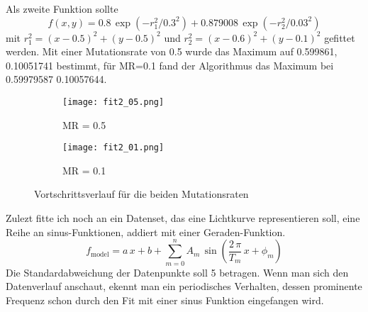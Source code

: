 \documentclass[12pt]{article}
\begin{document}
\newpage
Als zweite Funktion sollte 
$$f(x,y)=0.8\,\exp(-r_1^2/0.3^2)+0.879008\,\exp(-r_2^2/0.03^2)$$
mit $r_1^2=(x-0.5)^2+(y-0.5)^2$ und $r_2^2=(x-0.6)^2+(y-0.1)^2$ gefittet werden.\newline\newline
Mit einer Mutationsrate von 0.5 wurde das Maximum auf 0.599861, 0.10051741 bestimmt, für MR=0.1 fand der Algorithmus das Maximum bei 0.59979587 0.10057644.
\begin{figure}[H]\hspace*{-1.7cm}
    \begin{subfigure}{0.4\textwidth}
    \texttt{[image: fit2\_05.png]}
    \caption{MR = 0.5}
    \end{subfigure}
    \hfill
    \begin{subfigure}{0.4\textwidth}
    \hspace*{-0.8cm}
    \texttt{[image: fit2\_01.png]}
    \caption{MR = 0.1}
    \end{subfigure}
    \hfill
    \caption{Vortschrittsverlauf für die beiden Mutationsraten}
\end{figure}

\newpage
Zulezt fitte ich noch an ein Datenset, das eine Lichtkurve representieren soll, eine Reihe an sinus-Funktionen, addiert mit einer Geraden-Funktion.
$$f_\text{model}=a\,x+b+\sum_{m=0}^nA_m\,\sin(\frac{2\,\pi}{T_m}\,x+\phi_m)$$
Die Standardabweichung der Datenpunkte soll 5 betragen. Wenn man sich den Datenverlauf anschaut, ekennt man ein periodisches Verhalten, dessen prominente Frequenz schon durch den Fit mit einer sinus Funktion eingefangen wird.
\end{document}
